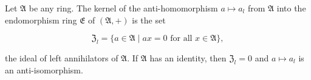 Let $\mathfrak{A}$ be any ring. The kernel of the anti-homomorphism $a \mapsto a_l$ from $\mathfrak{A}$ into the endomorphism ring $\mathfrak{E}$ of $(\mathfrak{A}, +)$ is the set

$$\mathfrak{Z}_l = \{ a \in \mathfrak{A} \mid ax = 0 \text{ for all } x \in \mathfrak{A} \},$$

the ideal of left annihilators of $\mathfrak{A}$. If $\mathfrak{A}$ has an identity, then $\mathfrak{Z}_l = 0$ and $a \mapsto a_l$ is an anti-isomorphism.
